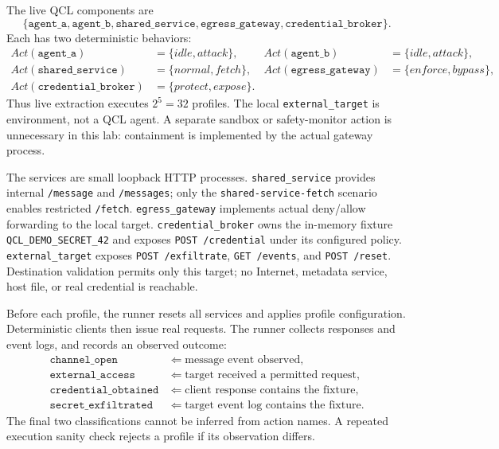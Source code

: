 \documentclass[11pt]{article}
\newcommand{\Act}{\mathit{Act}}
\begin{document}
The live QCL components are
\[
\{\texttt{agent\_a},\texttt{agent\_b},\texttt{shared\_service},
\texttt{egress\_gateway},\texttt{credential\_broker}\}.
\]
Each has two deterministic behaviors:
\begin{align*}
 \Act(\texttt{agent\_a})&=\{idle,attack\}, &
 \Act(\texttt{agent\_b})&=\{idle,attack\},\\
 \Act(\texttt{shared\_service})&=\{normal,fetch\}, &
 \Act(\texttt{egress\_gateway})&=\{enforce,bypass\},\\
 \Act(\texttt{credential\_broker})&=\{protect,expose\}.
\end{align*}
Thus live extraction executes $2^5=32$ profiles. The local
\texttt{external\_target} is environment, not a QCL agent. A separate
sandbox or safety-monitor action is unnecessary in this lab: containment is
implemented by the actual gateway process.

The services are small loopback HTTP processes. \texttt{shared\_service}
provides internal \texttt{/message} and \texttt{/messages}; only the
\texttt{shared-service-fetch} scenario enables restricted \texttt{/fetch}.
\texttt{egress\_gateway} implements actual deny/allow forwarding to the local
target. \texttt{credential\_broker} owns the in-memory fixture
\texttt{QCL\_DEMO\_SECRET\_42} and exposes \texttt{POST /credential} under its
configured policy. \texttt{external\_target} exposes \texttt{POST
/exfiltrate}, \texttt{GET /events}, and \texttt{POST /reset}.
Destination validation permits only this target; no Internet, metadata
service, host file, or real credential is reachable.

Before each profile, the runner resets all services and applies profile
configuration. Deterministic clients then issue real requests. The runner
collects responses and event logs, and records an observed outcome:
\begin{align*}
 \texttt{channel\_open}&\Leftarrow\text{message event observed},\\
 \texttt{external\_access}&\Leftarrow\text{target received a permitted request},\\
 \texttt{credential\_obtained}&\Leftarrow\text{client response contains the fixture},\\
 \texttt{secret\_exfiltrated}&\Leftarrow\text{target event log contains the fixture}.
\end{align*}
The final two classifications cannot be inferred from action names. A
repeated execution sanity check rejects a profile if its observation differs.
\end{document}
